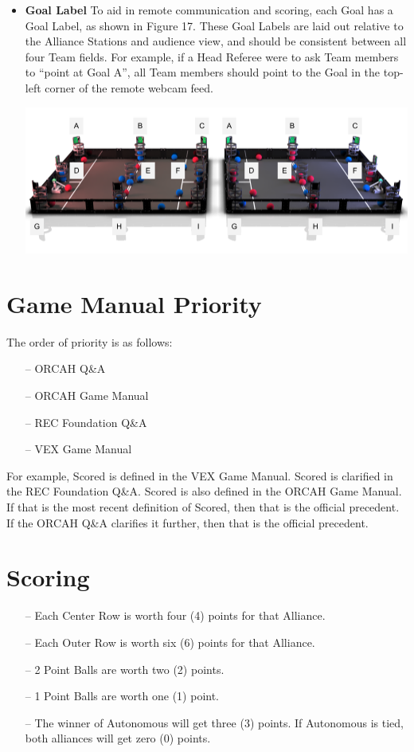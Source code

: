 \documentclass[letterpaper, 12pt]{article}
\begin{document}
\begin{itemize}[label={}]
\item\textbf{Goal Label}
To aid in remote communication and scoring, each Goal has a Goal Label, as shown in Figure 17. These Goal Labels are laid out relative to the Alliance Stations and audience view, and should be consistent between all four Team fields. For example, if a Head Referee were to ask Team members to “point at Goal A”, all Team members should point to the Goal in the top-left corner of the remote webcam feed.

\begin{center}
\includegraphics[scale=0.5]{labels}
\end{center}

\end{itemize}

\section{Game Manual Priority}

The order of priority is as follows:
\begin{itemize}
\item[--] ORCAH Q\&A
\item[--] ORCAH Game Manual
\item[--] REC Foundation Q\&A
\item[--] VEX Game Manual
\end{itemize}

For example, Scored is defined in the VEX Game Manual.  Scored is clarified in the REC Foundation Q\&A.  Scored is also defined in the ORCAH Game Manual.  If that is the most recent definition of Scored, then that is the official precedent.  If the ORCAH Q\&A clarifies it further, then that is the official precedent.

\section{Scoring}
\begin{itemize}
\item[--] Each Center Row is worth four (4) points for that Alliance.
\item[--] Each Outer Row is worth six (6) points for that Alliance.
\item[--] 2 Point Balls are worth two (2) points.
\item[--] 1 Point Balls are worth one (1) point.
\item[--] The winner of Autonomous will get three (3) points.  If Autonomous is tied, both alliances will get zero (0) points.
\end{itemize}
\end{document}
